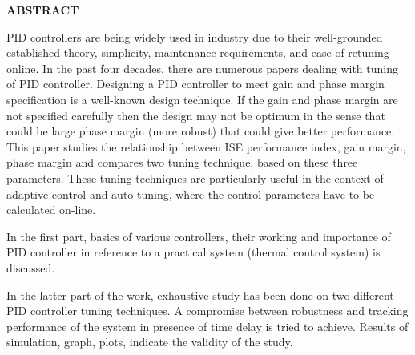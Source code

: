 \begin{center}
{\large {\bf  ABSTRACT }}
\end{center}  


    
PID controllers are being widely used in industry due to their well-grounded 
established theory, simplicity, maintenance requirements, and ease of retuning online. 
In  the  past  four  decades,  there  are  numerous  papers  dealing  with  tuning  of  PID 
controller. Designing a PID controller to meet gain and phase margin  specification is 
a  well-known  design  technique.  If  the  gain  and  phase  margin  are  not  specified 
carefully then the design may  not be optimum in the sense that could be  large phase 
margin  (more  robust)  that  could  give  better  performance.  This  paper  studies  the 
relationship between ISE performance index, gain margin, phase margin and 
compares  two  tuning  technique,  based  on  these  three  parameters.  These  tuning 
techniques  are  particularly  useful  in  the  context  of  adaptive  control  and  auto-tuning, 
where the control parameters have to be calculated on-line. 
 
In  the  first  part,  basics  of  various  controllers,  their  working  and  importance  of  PID 
controller in reference to a practical system (thermal control system) is discussed. 
 
In  the  latter  part  of  the  work,  exhaustive  study  has  been  done  on  two  different  PID 
controller tuning techniques. A compromise between robustness and tracking 
performance  of  the  system  in  presence  of  time  delay  is  tried  to  achieve.  Results  of 
simulation, graph, plots, indicate the validity of the study. 
